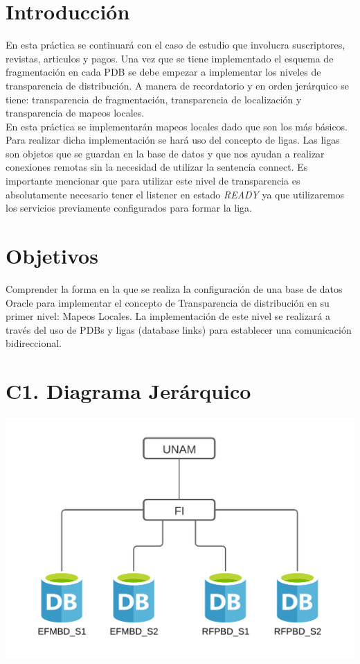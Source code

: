 \documentclass{article}
\begin{document}
\newpage

\section*{Introducción}

En esta práctica se continuará con el caso de estudio que involucra 
suscriptores, revistas, articulos y pagos. Una vez que se tiene implementado
el esquema de fragmentación en cada PDB se debe empezar a implementar los
niveles de transparencia de distribución. A manera de recordatorio y en orden 
jerárquico se tiene: transparencia de fragmentación, transparencia de 
localización y transparencia de mapeos locales. \\

En esta práctica se implementarán mapeos locales dado que son los más básicos.
Para realizar dicha implementación se hará uso del concepto de ligas. Las
ligas son objetos que se guardan en la base de datos y que nos ayudan a 
realizar conexiones remotas sin la necesidad de utilizar la sentencia connect.
Es importante mencionar que para utilizar este nivel de transparencia es 
absolutamente necesario tener el listener en estado \textit{READY} ya que 
utilizaremos los servicios previamente configurados para formar la liga.

\section*{Objetivos}

Comprender la forma en la que se realiza la configuración de una base de datos 
Oracle para implementar el concepto de Transparencia de distribución en su 
primer nivel: Mapeos Locales. La implementación de este nivel se realizará a 
través del uso de PDBs y ligas (database links) para establecer una 
comunicación bidireccional.

\section*{C1. Diagrama Jerárquico }

\includegraphics[width=\linewidth]{diagrama.png}
\end{document}
